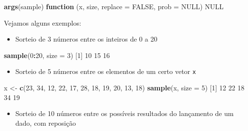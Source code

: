 \documentclass[10pt,a4paper]{book}
\newenvironment{Shaded}{\begin{snugshade}}{\end{snugshade}}
\newcommand{\KeywordTok}[1]{\textcolor[rgb]{0.13,0.29,0.53}{\textbf{#1}}}
\newcommand{\DataTypeTok}[1]{\textcolor[rgb]{0.13,0.29,0.53}{#1}}
\newcommand{\DecValTok}[1]{\textcolor[rgb]{0.00,0.00,0.81}{#1}}
\newcommand{\StringTok}[1]{\textcolor[rgb]{0.31,0.60,0.02}{#1}}
\newcommand{\OtherTok}[1]{\textcolor[rgb]{0.56,0.35,0.01}{#1}}
\newcommand{\ControlFlowTok}[1]{\textcolor[rgb]{0.13,0.29,0.53}{\textbf{#1}}}
\newcommand{\OperatorTok}[1]{\textcolor[rgb]{0.81,0.36,0.00}{\textbf{#1}}}
\newcommand{\NormalTok}[1]{#1}
\providecommand{\tightlist}{%
  \setlength{\itemsep}{0pt}\setlength{\parskip}{0pt}}
\begin{document}
\begin{Shaded}
\begin{Highlighting}[]
\KeywordTok{args}\NormalTok{(sample)}
\ControlFlowTok{function}\NormalTok{ (x, size, }\DataTypeTok{replace =} \OtherTok{FALSE}\NormalTok{, }\DataTypeTok{prob =} \OtherTok{NULL}\NormalTok{) }
\OtherTok{NULL}
\end{Highlighting}
\end{Shaded}

Vejamos alguns exemplos:

\begin{itemize}
\tightlist
\item
  Sorteio de 3 números entre os inteiros de 0 a 20
\end{itemize}

\begin{Shaded}
\begin{Highlighting}[]
\KeywordTok{sample}\NormalTok{(}\DecValTok{0}\OperatorTok{:}\DecValTok{20}\NormalTok{, }\DataTypeTok{size =} \DecValTok{3}\NormalTok{)}
\NormalTok{[}\DecValTok{1}\NormalTok{] }\DecValTok{10} \DecValTok{15} \DecValTok{16}
\end{Highlighting}
\end{Shaded}

\begin{itemize}
\tightlist
\item
  Sorteio de 5 números entre os elementos de um certo vetor \texttt{x}
\end{itemize}

\begin{Shaded}
\begin{Highlighting}[]
\NormalTok{x <-}\StringTok{ }\KeywordTok{c}\NormalTok{(}\DecValTok{23}\NormalTok{, }\DecValTok{34}\NormalTok{, }\DecValTok{12}\NormalTok{, }\DecValTok{22}\NormalTok{, }\DecValTok{17}\NormalTok{, }\DecValTok{28}\NormalTok{, }\DecValTok{18}\NormalTok{, }\DecValTok{19}\NormalTok{, }\DecValTok{20}\NormalTok{, }\DecValTok{13}\NormalTok{, }\DecValTok{18}\NormalTok{)}
\KeywordTok{sample}\NormalTok{(x, }\DataTypeTok{size =} \DecValTok{5}\NormalTok{)}
\NormalTok{[}\DecValTok{1}\NormalTok{] }\DecValTok{12} \DecValTok{22} \DecValTok{18} \DecValTok{34} \DecValTok{19}
\end{Highlighting}
\end{Shaded}

\begin{itemize}
\tightlist
\item
  Sorteio de 10 números entre os possíveis resultados do lançamento de
  um dado, com reposição
\end{itemize}
\end{document}
